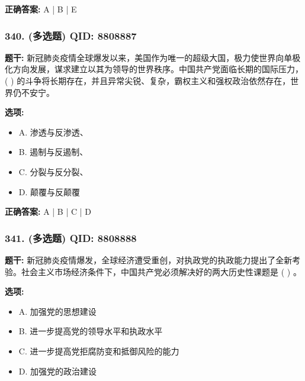 \documentclass[12pt,UTF8]{ctexart}
\begin{document}
\textbf{正确答案:}
A | B | E

\vspace{0.3em}\hrulefill\vspace{0.7em}

\subsubsection*{340. (多选题) \small QID: 8808887}

\textbf{题干:}
新冠肺炎疫情全球爆发以来，美国作为唯一的超级大国，极力使世界向单极化方向发展，谋求建立以其为领导的世界秩序。中国共产党面临长期的国际压力， ( ) 的斗争将长期存在，并且异常尖锐、复杂，霸权主义和强权政治依然存在，世界仍不安宁。

\textbf{选项:}
\begin{itemize}[leftmargin=*]

  \item A. 渗透与反渗透、

  \item B. 遏制与反遏制、

  \item C. 分裂与反分裂、

  \item D. 颠覆与反颠覆

\end{itemize}

\textbf{正确答案:}
A | B | C | D

\vspace{0.3em}\hrulefill\vspace{0.7em}

\subsubsection*{341. (多选题) \small QID: 8808888}

\textbf{题干:}
新冠肺炎疫情爆发，全球经济遭受重创，对执政党的执政能力提出了全新考验。社会主义市场经济条件下，中国共产党必须解决好的两大历史性课题是 ( ) 。

\textbf{选项:}
\begin{itemize}[leftmargin=*]

  \item A. 加强党的思想建设

  \item B. 进一步提高党的领导水平和执政水平

  \item C. 进一步提高党拒腐防变和抵御风险的能力

  \item D. 加强党的政治建设

\end{itemize}
\end{document}
